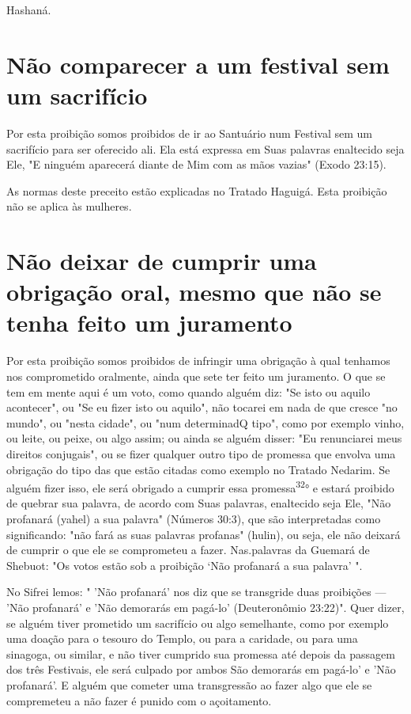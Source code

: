 \begin{itemize}
\begin{enumrate}
\begin{itemize}
\begin{itemize}
\begin{itemize}
Hashaná.

\section{Não comparecer a um festival sem um sacrifício}

Por esta proibição somos proibidos de ir ao Santuário num Festival sem
um sacrifício para ser oferecido ali. Ela está expressa em Suas palavras
enal­tecido seja Ele, "E ninguém aparecerá diante de Mim com as mãos
vazias" (Exodo 23:15).

As normas deste preceito estão explicadas no Tratado Haguigá. Esta
proibição não se aplica às mulheres.

\section{Não deixar de cumprir uma obrigação oral, mesmo que não se tenha 
feito um juramento}

Por esta proibição somos proibidos de infringir uma obrigação à qual
tenhamos nos comprometido oralmente, ainda que sete ter feito um
juramen­to. O que se tem em mente aqui é um voto, como quando alguém
diz: "Se isto ou aquilo acontecer", ou "Se eu fizer isto ou aquilo", não
tocarei em nada de que cresce "no mundo", ou "nesta cidade", ou "num
determinadQ tipo", como
por exemplo vinho, ou leite, ou peixe, ou algo assim; ou ainda se alguém
dis­ser: "Eu renunciarei meus direitos conjugais", ou se fizer qualquer
outro tipo de promessa que envolva uma obrigação do tipo das que estão
citadas como exemplo no Tratado Nedarim. Se alguém fizer isso, ele será
obrigado a cumprir essa promessa\textsuperscript{32}° e estará proibido
de quebrar sua palavra, de acordo com Suas palavras, enaltecido seja
Ele, "Não profanará (yahel) a sua palavra" (Números 30:3), que são
interpretadas como significando: "não fará as suas palavras pro­fanas"
(hulin), ou seja, ele não deixará de cumprir o que ele se comprometeu a
fazer. Nas.palavras da Guemará de Shebuot: "Os votos
estão sob a proibição `Não profanará a sua palavra' ".

No Sifrei lemos: " 'Não profanará' nos diz que se transgride duas
proi­bições --- 'Não profanará' e 'Não demorarás em pagá-lo'
(Deuteronômio 23:22)". Quer dizer, se alguém tiver prometido um
sacrifício ou algo semelhante, como por exemplo uma doação para o
tesouro do Templo, ou para a caridade, ou para uma sinagoga, ou similar,
e não tiver cumprido sua promessa até depois da passagem dos três
Festivais, ele será culpado por ambos São demorarás em pagá-lo' e 'Não
profanará'. E alguém que cometer uma transgressão ao fazer al­go que ele
se compremeteu a não fazer é punido com o açoitamento.



\end{itemize}
\end{itemize}
\end{itemize}
\end{enumrate}
\end{itemize}

